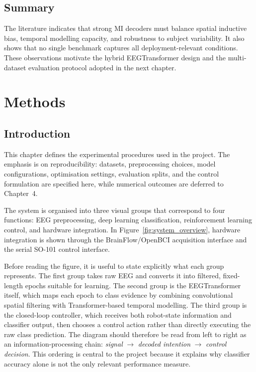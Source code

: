 \documentclass[12pt, a4paper]{article}
\begin{document}
\subsection{Summary}

The literature indicates that strong MI decoders must balance spatial inductive bias, temporal modelling capacity, and robustness to subject variability. It also shows that no single benchmark captures all deployment-relevant conditions. These observations motivate the hybrid EEGTransformer design and the multi-dataset evaluation protocol adopted in the next chapter.

\section{Methods}

\subsection{Introduction}

This chapter defines the experimental procedures used in the project. The emphasis is on reproducibility: datasets, preprocessing choices, model configurations, optimisation settings, evaluation splits, and the control formulation are specified here, while numerical outcomes are deferred to Chapter~4.

The system is organised into three visual groups that correspond to four functions: EEG preprocessing, deep learning classification, reinforcement learning control, and hardware integration. In Figure~\ref{fig:system_overview}, hardware integration is shown through the BrainFlow/OpenBCI acquisition interface and the serial SO-101 control interface.

Before reading the figure, it is useful to state explicitly what each group represents. The first group takes raw EEG and converts it into filtered, fixed-length epochs suitable for learning. The second group is the EEGTransformer itself, which maps each epoch to class evidence by combining convolutional spatial filtering with Transformer-based temporal modelling. The third group is the closed-loop controller, which receives both robot-state information and classifier output, then chooses a control action rather than directly executing the raw class prediction. The diagram should therefore be read from left to right as an information-processing chain: \emph{signal} $\rightarrow$ \emph{decoded intention} $\rightarrow$ \emph{control decision}. This ordering is central to the project because it explains why classifier accuracy alone is not the only relevant performance measure.
\end{document}
